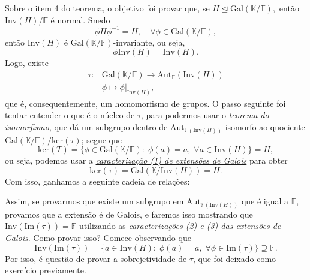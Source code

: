 \documentclass[../algebraIII_notes.tex]{subfiles}
\begin{document}
Sobre o item 4 do teorema, o objetivo foi provar que, se \(H \trianglelefteq \mathrm{Gal}(\mathbb{K}/\mathbb{F}),\) então \(\mathrm{Inv}(H)/\mathbb{F}\) é normal. Snedo
\[
	\phi H\phi^{-1}= H, \quad \forall \phi \in \mathrm{Gal}(\mathbb{K}/\mathbb{F}),
\]
então \(\mathrm{Inv}(H)\) é \(\mathrm{Gal}(\mathbb{K}/\mathbb{F})\)-invariante, ou seja,
\[
	\phi \mathrm{Inv}(H) = \mathrm{Inv}(H).
\]
Logo, existe
\begin{align*}
	\tau : & \mathrm{Gal}(\mathbb{K}/\mathbb{F})\rightarrow \mathrm{Aut}_{\mathbb{F}}(\mathrm{Inv}(H)) \\
	       & \phi \longmapsto \phi|_{\mathrm{Inv}(H)},
\end{align*}
que é, consequentemente, um homomorfismo de grupos. O passo seguinte foi tentar entender o que é o núcleo de \(\tau \), para podermos usar o \hyperlink{isomorphism_theorem}{\textit{teorema do isomorfismo}}, que dá um subgrupo dentro de \(\mathrm{Aut}_{\mathbb{F}(\mathrm{Inv}(H))}\) isomorfo ao quociente \(\mathrm{Gal}(\mathbb{K}/\mathbb{F})/\mathrm{ker}(\tau ) \); segue que
\[
	\mathrm{ker}(T) = \{\phi \in \mathrm{Gal}(\mathbb{K}/\mathbb{F}):\; \phi (a) =a,\; \forall a\in \mathrm{Inv}(H)\} = H,
\]
ou seja, podemos usar a \hyperlink{galois_characterization}{\textit{caracterização (1) de extensões de Galois}} para obter
\[
	\mathrm{ker}(\tau ) = \mathrm{Gal}(\mathbb{K}/\mathrm{Inv}(H))=H.
\]
Com isso, ganhamos a seguinte cadeia de relações:
\begin{center}
\end{center}
Assim, se provarmos que existe um subgrupo em \(\mathrm{Aut}_{\mathbb{F}(\mathrm{Inv}(H))}\) que é igual a \(\mathbb{F}\), provamos que a extensão é de Galois, e faremos isso mostrando que \(\mathrm{Inv}(\mathrm{Im}(\tau ))=\mathbb{F}\) utilizando as \hyperlink{galois_characterization}{\textit{caracterizações (2) e (3) das extensões de Galois}}.
Como provar isso? Comece observando que
\[
	\mathrm{Inv}(\mathrm{Im}(\tau )) = \{a\in \mathrm{Inv}(H):\; \phi (a) =a,\; \forall \phi \in \mathrm{Im}(\tau )\}\supseteq \mathbb{F}.
\]
Por isso, é questão de provar a sobrejetividade de \(\tau \), que foi deixado como exercício previamente.
\end{document}
